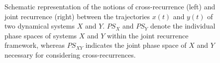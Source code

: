 \documentclass[graybox]{svmult}
\begin{document}
\begin{figure}
\centering
 \hfill
{}
\caption{Schematic representation of the notions of cross-recurrence (left) and joint recurrence (right) between the trajectories $x(t)$ and $y(t)$ of two dynamical systems $X$ and $Y$. $PS_X$ and $PS_Y$ denote the individual phase spaces of systems $X$ and $Y$ within the joint recurrence framework, whereas $PS_{XY}$ indicates the joint phase space of $X$ and $Y$ necessary for considering cross-recurrences.}
\label{fig:sketch_cr_jr}
\end{figure}
\end{document}
